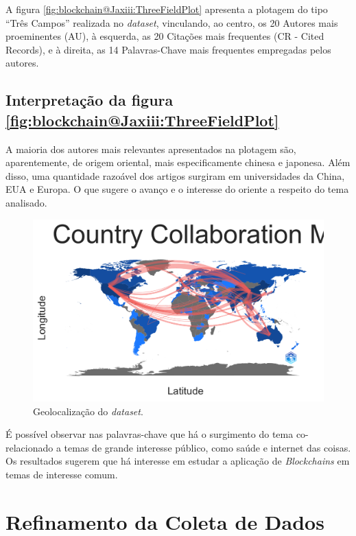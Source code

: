 A figura \ref{fig:blockchain@Jaxiii:ThreeFieldPlot} apresenta a plotagem do tipo ``Três Campos'' realizada no \textit{dataset}, vinculando, ao centro, os 20 Autores mais proeminentes (AU), à esquerda, as 20 Citações mais frequentes (CR - Cited Records), e à direita, as 14 Palavras-Chave mais frequentes empregadas pelos autores.

\subsection{Interpretação da figura \ref{fig:blockchain@Jaxiii:ThreeFieldPlot}}
A maioria dos autores mais relevantes apresentados na plotagem são, aparentemente, de origem oriental, mais especificamente chinesa e japonesa. Além disso, uma quantidade razoável dos artigos surgiram em universidades da China, EUA e Europa. O que sugere o avanço e o interesse do oriente a respeito do tema analisado.

\begin{figure}
    \centering
    \includegraphics[angle=0,width=1\textwidth]{experiments/Jaxiii/PesquisaBibliometrica/Blockchains/world-map.png}
    \caption{Geolocalização do \textit{dataset}.}
    \label{fig:evol:anual:geo:blockchain@Jaxiii}
\end{figure}

É possível observar nas palavras-chave que há o surgimento do tema co-relacionado a temas de grande interesse público, como saúde e internet das coisas.
Os resultados sugerem que há interesse em estudar a aplicação de \textit{Blockchains} em temas de interesse comum.

\section{Refinamento da Coleta de Dados}

